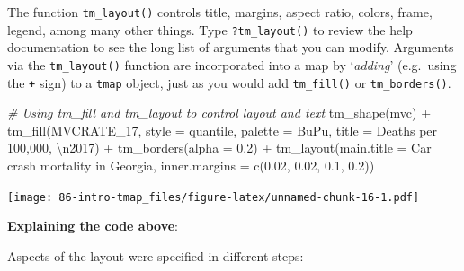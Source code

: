 \documentclass[
]{book}
\newenvironment{Shaded}{\begin{snugshade}}{\end{snugshade}}
\newcommand{\AttributeTok}[1]{\textcolor[rgb]{0.77,0.63,0.00}{#1}}
\newcommand{\CommentTok}[1]{\textcolor[rgb]{0.56,0.35,0.01}{\textit{#1}}}
\newcommand{\FloatTok}[1]{\textcolor[rgb]{0.00,0.00,0.81}{#1}}
\newcommand{\FunctionTok}[1]{\textcolor[rgb]{0.00,0.00,0.00}{#1}}
\newcommand{\NormalTok}[1]{#1}
\newcommand{\SpecialCharTok}[1]{\textcolor[rgb]{0.00,0.00,0.00}{#1}}
\newcommand{\StringTok}[1]{\textcolor[rgb]{0.31,0.60,0.02}{#1}}
\begin{document}
The function \texttt{tm\_layout()} controls title, margins, aspect ratio, colors, frame, legend, among many other things. Type \texttt{?tm\_layout()} to review the help documentation to see the long list of arguments that you can modify. Arguments via the \texttt{tm\_layout()} function are incorporated into a map by `\emph{adding}' (e.g.~using the \texttt{+} sign) to a \texttt{tmap} object, just as you would add \texttt{tm\_fill()} or \texttt{tm\_borders()}.

\begin{Shaded}
\begin{Highlighting}[]
\CommentTok{\# Using tm\_fill and tm\_layout to control layout and text}
\FunctionTok{tm\_shape}\NormalTok{(mvc) }\SpecialCharTok{+}
  \FunctionTok{tm\_fill}\NormalTok{(}\StringTok{\textquotesingle{}MVCRATE\_17\textquotesingle{}}\NormalTok{,}
          \AttributeTok{style =} \StringTok{\textquotesingle{}quantile\textquotesingle{}}\NormalTok{,}
          \AttributeTok{palette =} \StringTok{\textquotesingle{}BuPu\textquotesingle{}}\NormalTok{,}
          \AttributeTok{title =} \StringTok{\textquotesingle{}Deaths per 100,000, }\SpecialCharTok{\textbackslash{}n}\StringTok{2017\textquotesingle{}}\NormalTok{) }\SpecialCharTok{+}
  \FunctionTok{tm\_borders}\NormalTok{(}\AttributeTok{alpha =} \FloatTok{0.2}\NormalTok{) }\SpecialCharTok{+}
  \FunctionTok{tm\_layout}\NormalTok{(}\AttributeTok{main.title =} \StringTok{\textquotesingle{}Car crash mortality in Georgia\textquotesingle{}}\NormalTok{,}
            \AttributeTok{inner.margins =} \FunctionTok{c}\NormalTok{(}\FloatTok{0.02}\NormalTok{, }\FloatTok{0.02}\NormalTok{, }\FloatTok{0.1}\NormalTok{, }\FloatTok{0.2}\NormalTok{))}
\end{Highlighting}
\end{Shaded}

\texttt{[image: 86-intro-tmap\_files/figure-latex/unnamed-chunk-16-1.pdf]}

\textbf{Explaining the code above}:

Aspects of the layout were specified in different steps:
\end{document}
